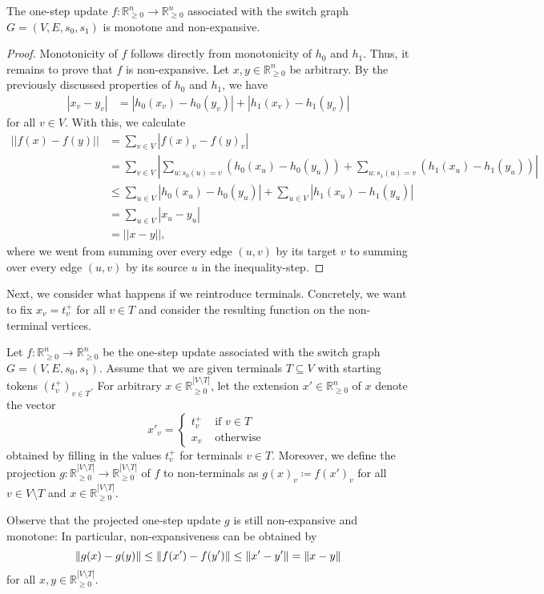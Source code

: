 \documentclass[a4paper,UKenglish,cleveref, autoref, thm-restate]{lipics-v2021}
\newcommand{\R}{\mathbb{R}}
\DeclarePairedDelimiter\norm{\lVert}{\rVert}
\begin{document}
\begin{lemma}
\label{lemma:non-expansiveness_monotonicity}
    The one-step update $f : \R^n_{\geq 0} \rightarrow \R^n_{\geq 0}$ associated with the switch graph $G = (V, E, s_0, s_1)$ is monotone and non-expansive.
\end{lemma}
\begin{proof}
    Monotonicity of $f$ follows directly from monotonicity of $h_0$ and $h_1$. Thus, it remains to prove that $f$ is non-expansive. Let $x, y \in \R^n_{\geq 0}$ be arbitrary. By the previously discussed properties of $h_0$ and $h_1$, we have 
    \begin{align*}
        |x_v - y_v| &= | h_0(x_v) - h_0(y_v)| + | h_1(x_v) - h_1(y_v)  |
    \end{align*}
    for all $v \in V$. With this, we calculate
    \begin{align*}
        ||f(x) - f(y)|| &= \sum_{v \in V} | f(x)_v - f(y)_v | \\
        &= \sum_{v \in V} \left| \sum_{u: s_0(u) = v} (h_0(x_u) - h_0(y_u)) 
        + \sum_{u: s_1(u) = v}  ( h_1(x_u) - h_1(y_u) ) \right| \\
        &\leq \sum_{u \in V}  \left| h_0(x_u) - h_0(y_u) \right| + \sum_{u \in V}  \left| h_1(x_u) - h_1(y_u) \right| \\
        &= \sum_{u \in V} |x_u - y_u| \\
        &= || x - y ||,
    \end{align*}
    where we went from summing over every edge $(u, v)$ by its target $v$ to summing over every edge $(u, v)$ by its source $u$ in the inequality-step.
\end{proof}
Next, we consider what happens if we reintroduce terminals. Concretely, we want to fix $x_v = t^+_v$ for all $v \in T$ and consider the resulting function on the non-terminal vertices.

\begin{definition}
    Let $f : \R^n_{\geq 0} \rightarrow \R^n_{\geq 0}$ be the one-step update associated with the switch graph $G = (V, E, s_0, s_1)$. Assume that we are given terminals $T \subseteq V$ with starting tokens $(t^+_v)_{v \in T}$. For arbitrary $x \in \R^{|V \setminus T|}_{\geq 0}$, let the extension $x' \in \R^n_{\geq 0}$ of $x$ denote the vector
    \[
        x'_v = \begin{cases}
            t^+_v & \text{ if } v \in T \\
            x_v & \text{ otherwise } 
        \end{cases}
    \]
    obtained by filling in the values $t^+_v$ for terminals $v \in T$. Moreover, we define the projection $g : \R^{|V \setminus T|}_{\geq 0} \rightarrow \R^{|V \setminus T|}_{\geq 0}$ of $f$ to non-terminals as $g(x)_v \coloneqq f(x')_v$
    for all $v \in V \setminus T$ and $x \in \R^{|V \setminus T|}_{\geq 0}$.
\end{definition}
Observe that the projected one-step update $g$ is still non-expansive and monotone: In particular, non-expansiveness can be obtained by
\[
    \norm{g(x) - g(y)} \leq \norm{f(x') - f(y')} \leq \norm{x' - y'} = \norm{x - y}
\]
for all $x, y \in \R_{\geq 0}^{|V \setminus T|}$.
\end{document}
